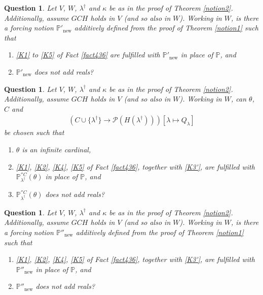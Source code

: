 \documentclass[12pt, twoside]{memoir}
\numberwithin{equation}{section}
\newtheorem{ques}[thm]{Question}
\theoremstyle{definition}
\theoremstyle{remark}
\theoremstyle{definition}
\theoremstyle{definition}
\theoremstyle{definition}
\theoremstyle{remark}
\begin{document}
\begin{ques}
Let $V$, $W$, $\lambda^{\dagger}$ and $\kappa$ be as in the proof of Theorem \ref{notion2}. Additionally, assume $GCH$ holds in $V$ (and so also in $W$). Working in  $W$, is there a forcing notion $\mathbb{P}'_{\mathrm{new}}$ additively defined from the proof of Theorem \ref{notion1} such that
\begin{enumerate}[label=(\arabic*)]
    \item \ref{K1} to \ref{K5} of Fact \ref{fact436} are fulfilled with $\mathbb{P}'_{\mathrm{new}}$ in place of $\mathbb{P}$, and
    \item $\mathbb{P}'_{\mathrm{new}}$ does not add reals?
\end{enumerate}
\end{ques}

\begin{ques}\label{addsreals2'}
Let $V$, $W$, $\lambda^{\dagger}$ and $\kappa$ be as in the proof of Theorem \ref{notion2}. Additionally, assume $GCH$ holds in $V$ (and so also in $W$). Working in $W$, can $\theta$, $C$ and 
\begin{gather*}
    (C \cup \{\lambda^{\dagger}\} \longrightarrow \mathcal{P}(H(\lambda^{\dagger}))) [\lambda \mapsto Q_{\lambda}]
\end{gather*}
be chosen such that
\begin{enumerate}[label=(\arabic*)]
    \item $\theta$ is an infinite cardinal,
    \item \ref{K1}, \ref{K2}, \ref{K4}, \ref{K5} of Fact \ref{fact436}, together with \ref{K3'}, are fulfilled with $\mathbb{P}^{''C}_{\lambda^{\dagger}}(\theta)$ in place of $\mathbb{P}$, and
    \item $\mathbb{P}^{''C}_{\lambda^{\dagger}}(\theta)$ does not add reals?
\end{enumerate}
\end{ques}

\begin{ques}
Let $V$, $W$, $\lambda^{\dagger}$ and $\kappa$ be as in the proof of Theorem \ref{notion2}. Additionally, assume $GCH$ holds in $V$ (and so also in $W$). Working in $W$, is there a forcing notion $\mathbb{P}''_{\mathrm{new}}$ additively defined from the proof of Theorem \ref{notion1} such that
\begin{enumerate}[label=(\arabic*)]
    \item \ref{K1}, \ref{K2}, \ref{K4}, \ref{K5} of Fact \ref{fact436}, together with \ref{K3'}, are fulfilled with $\mathbb{P}''_{\mathrm{new}}$ in place of $\mathbb{P}$, and
    \item $\mathbb{P}''_{\mathrm{new}}$ does not add reals?
\end{enumerate}
\end{ques}
\end{document}
